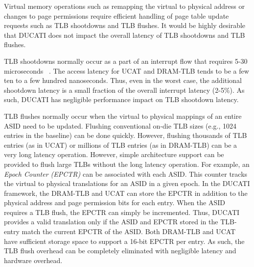 % 

\noindent Virtual memory operations such as remapping the virtual to
physical address or changes to page permissions require efficient
handling of page table update requests such as TLB shootdowns and TLB
flushes. It would be highly desirable that DUCATI does not impact the
overall latency of TLB shootdowns and TLB flushes.

TLB shootdowns normally occur as a part of an interrupt flow that
requires 5-30 microseconds ~\cite{zhengpagedgpu}. The access latency
for UCAT and DRAM-TLB tends to be a few ten to a few hundred nanoseconds. Thus, even in the worst case, the additional shootdown
latency is a small fraction of the overall interrupt latency (2-5\%).
As such, DUCATI has negligible performance impact on TLB shootdown
latency.

TLB flushes normally occur when the virtual to physical mappings of an
entire ASID need to be updated. Flushing conventional on-die TLB sizes
(e.g., 1024 entries in the baseline) can be done quickly. However,
flushing thousands of TLB entries (as in UCAT) or millions of TLB
entries (as in DRAM-TLB) can be a very long latency operation.
However, simple architecture support can be provided to flush large
TLBs without the long latency operation. For example, an {\em Epoch
Counter (EPCTR)} can be associated with each ASID. This counter tracks
the virtual to physical translations for an ASID in a given epoch. In
the DUCATI framework, the DRAM-TLB and UCAT can store the EPCTR in
addition to the physical address and page permission bits for each
entry. When the
ASID requires a TLB flush, the EPCTR can simply be incremented. Thus,
DUCATI provides a valid translation only if the ASID and EPCTR stored
in the TLB-entry match the current EPCTR of the ASID. Both DRAM-TLB
and UCAT have sufficient storage space to support a 16-bit EPCTR per entry. As
such, the TLB flush overhead can be completely eliminated with
negligible latency and hardware overhead.

